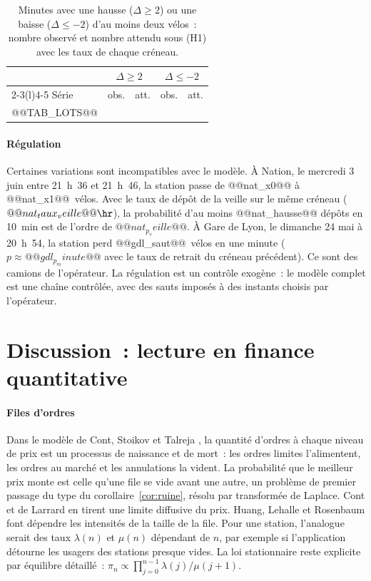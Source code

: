 \begin{table}[t]
\centering\small
\caption{Minutes avec une hausse ($\Delta\geq2$) ou une baisse ($\Delta\leq-2$) d'au moins deux vélos~: nombre observé et nombre attendu sous (H1) avec les taux de chaque créneau.}\label{tab:lots}
\setlength{\tabcolsep}{4pt}
\begin{tabular}{@{}lrrrr@{}}
\toprule
& \multicolumn{2}{c}{$\Delta\geq2$} & \multicolumn{2}{c}{$\Delta\leq-2$}\\
\cmidrule(lr){2-3}\cmidrule(l){4-5}
Série & obs. & att. & obs. & att.\\
\midrule
@@TAB_LOTS@@
\bottomrule
\end{tabular}
\end{table}

\paragraph{Régulation} Certaines variations sont incompatibles avec le modèle. À Nation, le mercredi 3 juin entre 21~h~36 et 21~h~46, la station passe de @@nat_x0@@ à @@nat_x1@@~vélos. Avec le taux de dépôt de la veille sur le même créneau ($@@nat_taux_veille@@\hr$), la probabilité d'au moins @@nat_hausse@@ dépôts en 10~min est de l'ordre de $@@nat_p_veille@@$. À Gare de Lyon, le dimanche 24 mai à 20~h~54, la station perd @@gdl_saut@@~vélos en une minute ($p\approx@@gdl_p_minute@@$ avec le taux de retrait du créneau précédent). Ce sont des camions de l'opérateur. La régulation est un contrôle exogène~: le modèle complet est une chaîne contrôlée, avec des sauts imposés à des instants choisis par l'opérateur.

\section{Discussion~: lecture en finance quantitative}\label{sec:discussion}

\paragraph{Files d'ordres} Dans le modèle de Cont, Stoikov et Talreja \cite{CST10}, la quantité d'ordres à chaque niveau de prix est un processus de naissance et de mort~: les ordres limites l'alimentent, les ordres au marché et les annulations la vident. La probabilité que le meilleur prix monte est celle qu'une file se vide avant une autre, un problème de premier passage du type du corollaire~\ref{cor:ruine}, résolu par transformée de Laplace. Cont et de Larrard \cite{CdL13} en tirent une limite diffusive du prix. Huang, Lehalle et Rosenbaum \cite{HLR15} font dépendre les intensités de la taille de la file. Pour une station, l'analogue serait des taux $\lambda(n)$ et $\mu(n)$ dépendant de $n$, par exemple si l'application détourne les usagers des stations presque vides. La loi stationnaire reste explicite par équilibre détaillé~: $\pi_n\propto\prod_{j=0}^{n-1}\lambda(j)/\mu(j+1)$.


